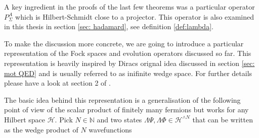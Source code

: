 \documentclass[b5paper,draft,openbib,12pt]{memoir}
\begin{document}
A key ingredient in the proofs of the last few theorems was 
a particular operator \(P^A_\Sigma\) which is Hilbert-Schmidt
close to a projector. This operator is also examined in 
this thesis in section \ref{sec: hadamard}, 
see definition \ref{def:lambda}.

To make the discussion more concrete, we are going to 
introduce a particular representation of the Fock spaces 
and evolution operators discussed so far. This representation 
is heavily inspired by Diracs orignal idea discussed in section 
\ref{sec: mot QED} and is usually referred to as inifinite wedge
space. For further details please have a look at section 2 of 
\cite{ivp0}. 

The basic idea behind this representation is a generalisation of 
the following point of view of the scalar product of finitely many 
fermions but works for any Hilbert space \(\mathcal{H}\). 
Pick \(N\in\mathbb{N}\) and two states 
\(\mathsf{\Lambda}\Psi,\mathsf{\Lambda}\Phi\in \mathcal{H}^{\wedge N}\) that can be written 
as the wedge product of \(N\) wavefunctions
\end{document}
